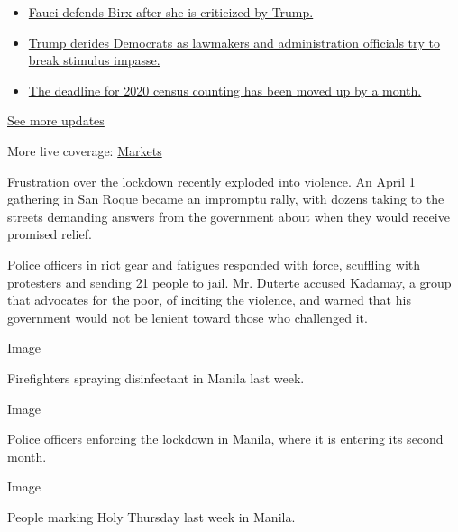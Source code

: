 \begin{itemize}
\tightlist
\item
  \href{https://www.nytimes.com/2020/08/03/world/coronavirus-covid-19.html?action=click\&pgtype=Article\&state=default\&region=MAIN_CONTENT_1\&context=storylines_live_updates\#link-4547638f}{Fauci
  defends Birx after she is criticized by Trump.}
\item
  \href{https://www.nytimes.com/2020/08/03/world/coronavirus-covid-19.html?action=click\&pgtype=Article\&state=default\&region=MAIN_CONTENT_1\&context=storylines_live_updates\#link-15e7f995}{Trump
  derides Democrats as lawmakers and administration officials try to
  break stimulus impasse.}
\item
  \href{https://www.nytimes.com/2020/08/03/world/coronavirus-covid-19.html?action=click\&pgtype=Article\&state=default\&region=MAIN_CONTENT_1\&context=storylines_live_updates\#link-e5a2cda}{The
  deadline for 2020 census counting has been moved up by a month.}
\end{itemize}

\href{https://www.nytimes.com/2020/08/03/world/coronavirus-covid-19.html?action=click\&pgtype=Article\&state=default\&region=MAIN_CONTENT_1\&context=storylines_live_updates}{See
more updates}

More live coverage:
\href{https://www.nytimes.com/live/2020/08/03/business/stock-market-today-coronavirus?action=click\&pgtype=Article\&state=default\&region=MAIN_CONTENT_1\&context=storylines_live_updates}{Markets}

Frustration over the lockdown recently exploded into violence. An April
1 gathering in San Roque became an impromptu rally, with dozens taking
to the streets demanding answers from the government about when they
would receive promised relief.

Police officers in riot gear and fatigues responded with force,
scuffling with protesters and sending 21 people to jail. Mr. Duterte
accused Kadamay, a group that advocates for the poor, of inciting the
violence, and warned that his government would not be lenient toward
those who challenged it.

Image

Firefighters spraying disinfectant in Manila last week.

Image

Police officers enforcing the lockdown in Manila, where it is entering
its second month.

Image

People marking Holy Thursday last week in Manila.

